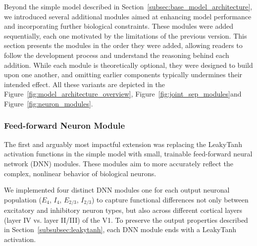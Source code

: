 Beyond the simple model described in Section~\ref{subsec:base_model_architecture}, we introduced several additional modules aimed at enhancing model performance and incorporating further biological constraints. These modules were added sequentially, each one motivated by the limitations of the previous version. This section presents the modules in the order they were added, allowing readers to follow the development process and understand the reasoning behind each addition. While each module is theoretically optional, they were designed to build upon one another, and omitting earlier components typically undermines their intended effect. All these variants are depicted in the Figure~\ref{fig:model_architecture_overview}, Figure~\ref{fig:joint_sep_modules}and Figure~\ref{fig:neuron_modules}.

\subsubsection{Feed-forward Neuron Module}
\label{subsubsec:dnn_neuron}

The first and arguably most impactful extension was replacing the LeakyTanh activation functions in the simple model with small, trainable feed-forward neural network (DNN) modules. These modules aim to more accurately reflect the complex, nonlinear behavior of biological neurons.

We implemented four distinct DNN modules one for each output neuronal population ($E_4$, $I_4$, $E_{2/3}$, $I_{2/3}$) to capture functional differences not only between excitatory and inhibitory neuron types, but also across different cortical layers (layer IV vs. layer II/III) of the V1. To preserve the output properties described in Section~\ref{subsubsec:leakytanh}, each DNN module ends with a LeakyTanh activation.

